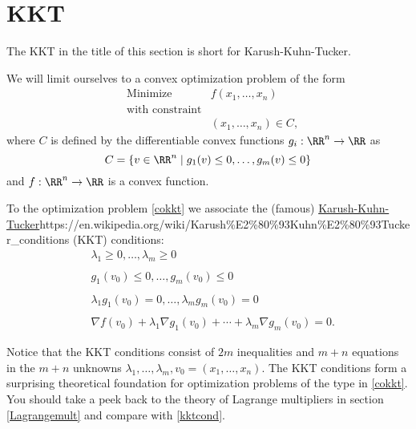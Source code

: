\documentclass{article}
\begin{document}
\section{KKT}

The KKT in the title of this section is short for Karush-Kuhn-Tucker.

We will limit ourselves to a convex optimization problem of the form
  \begin{align}\label{cokkt}
    &\text{Minimize} &f(x_1, \dots, x_n)\\
    &\text{with constraint}\\
    &&(x_1, \dots, x_n)\in C,
  \end{align}
  where $C$ is defined by the differentiable convex functions
  $g_i:\RR^n\rightarrow \RR$ as
  $$
  C = \{v\in \RR^n \mid g_1(v) \leq 0, \dots, g_m(v)\leq 0\}
  $$
  and $f:\RR^n\rightarrow \RR$ is a convex function.

  To the optimization problem \eqref{cokkt} we associate the (famous)
  \url{Karush-Kuhn-Tucker}{https://en.wikipedia.org/wiki/Karush\%E2\%80\%93Kuhn\%E2\%80\%93Tucker_conditions} (KKT) conditions:
  \begin{align}[emph]\label{kktcond}
    &\lambda_1 \geq 0, \dots, \lambda_m\geq 0\\
    \\
    &g_1(v_0)\leq 0, \dots, g_m(v_0)\leq 0\\
    \\
    &\lambda_1 g_1(v_0) = 0, \dots, \lambda_m g_m(v_0) = 0\\
      \\
    &\nabla f(v_0) + \lambda_1 \nabla g_1(v_0) + \cdots + \lambda_m
    \nabla g_m(v_0) = 0.
  \end{align}

  Notice that the KKT conditions consist of  $2m$ inequalities and $m+n$
  equations in the $m+n$ unknowns
  $\lambda_1, \dots, \lambda_m, v_0 = (x_1, \dots, x_n)$. The KKT
  conditions form a surprising theoretical foundation for optimization
  problems of the type in \eqref{cokkt}. You should take a peek back
  to the theory of Lagrange multipliers in section \ref{Lagrangemult} and
  compare with \eqref{kktcond}.
\end{document}
